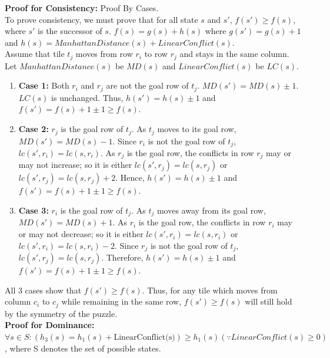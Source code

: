 \documentclass[runningheads]{llncs}
\begin{document}
\textbf{Proof for Consistency:} Proof By Cases. \\
    To prove consistency, we must prove that for all state \( s \) and \( s' \), \( f(s') \geq f(s) \), where \( s' \) is the successor of \( s \). \(f(s) = g(s) + h(s) \) where $g(s') = g(s) + 1$ and $h(s) = ManhattanDistance(s) + LinearConflict(s)$. \\
Assume that tile \( t_j \) moves from row \( r_i \) to row \( r_j \) and stays in the same column. Let \( ManhattanDistance(s) \) be \( MD(s) \) and \( LinearConflict(s) \) be \( LC(s) \). 
\begin{enumerate}
    \item \textbf{Case 1:} Both \( r_i \) and \( r_j \) are not the goal row of \( t_j \). \( MD(s') = MD(s) \pm 1 \). \( LC(s) \) is unchanged. Thus, \( h(s') = h(s) \pm 1 \) and \( f(s') = f(s) + 1 \pm 1 \geq f(s) \).
    
    \item \textbf{Case 2:} \( r_j \) is the goal row of \( t_j \). As \( t_j \) moves to its goal row, \( MD(s') = MD(s) - 1 \). Since \( r_i \) is not the goal row of \( t_j \), \( lc(s', r_i) = lc(s, r_i) \). 
        As \( r_j \) is the goal row, the conflicts in row \( r_j \) may or may not increase; so it is either \( lc(s', r_j) = lc(s, r_j) \) or \( lc(s', r_j) = lc(s, r_j) + 2 \). 
        Hence, \( h(s') = h(s) \pm 1 \) and \( f(s') = f(s) + 1 \pm 1 \geq f(s) \).

    \item \textbf{Case 3:} \( r_i \) is the goal row of \( t_j \). As \( t_j \) moves away from its goal row, \( MD(s') = MD(s) + 1 \). 
        As \( r_i \) is the goal row, the conflicts in row \( r_i \) may or may not decrease; so it is either \( lc(s', r_i) = lc(s, r_i) \) or \( lc(s', r_i) = lc(s, r_i) - 2 \). 
        Since \( r_j \) is not the goal row of \( t_j \), \( lc(s', r_j) = lc(s, r_j) \). 
        Therefore, \( h(s') = h(s) \pm 1 \) and \( f(s') = f(s) + 1 \pm 1 \geq f(s) \).
\end{enumerate}
All 3 cases show that \( f(s') \geq f(s) \). Thus, for any tile which moves from column \( c_i \) to \( c_j \) while remaining in the same row, \( f(s') \geq f(s) \) will still hold by the symmetry of the puzzle. \\
\textbf{Proof for Dominance:} \( \forall s \in S: (h_3(s) = h_1(s) + \text{LinearConflict(s)}) \geq h_{1}(s) (\because LinearConflict(s) \geq 0) \), where S denotes the set of possible states.
\end{document}
